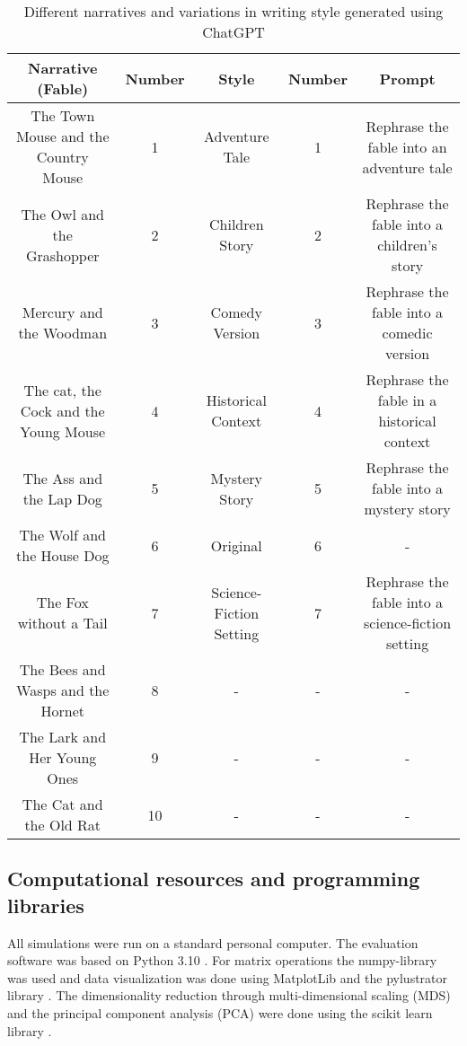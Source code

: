 \begin{table*}[h!]
\begin{center}
\caption{Different narratives and variations in writing style generated using ChatGPT}
\begin{tabular}{cc||ccc}
Narrative (Fable) & Number & Style & Number & Prompt\\
\hline
The Town Mouse and the Country Mouse & 1 & Adventure Tale & 1 & Rephrase the fable into an adventure tale \\
The Owl and the Grashopper & 2 & Children Story & 2 & Rephrase the fable into a children's story\\
Mercury and the Woodman & 3 & Comedy Version & 3 & Rephrase the fable into a comedic version\\
The cat, the Cock and the Young Mouse & 4 & Historical Context & 4 & Rephrase the fable in a historical context\\
The Ass and the Lap Dog & 5 &  Mystery Story & 5 & Rephrase the fable into a mystery story\\
The Wolf and the House Dog & 6 & Original & 6 & -\\
The Fox without a Tail & 7 & Science-Fiction Setting & 7 & Rephrase the fable into a science-fiction setting\\
The Bees and Wasps and the Hornet & 8 & - & - &-\\
The Lark and Her Young Ones & 9 & - & - & -\\
The Cat and the Old Rat & 10 & - & - & -\\
\end{tabular}
\label{tab:inputdata}
\end{center}
\end{table*}

\subsection{Computational resources and programming libraries}
All simulations were run on a standard personal computer. The evaluation software was based on Python 3.10 \cite{oliphant2007python}. For matrix operations the numpy-library \cite{van2011numpy} was used and data visualization was done using MatplotLib \cite{hunter2007matplotlib} and the pylustrator library \cite{gerum2019pylustrator}. The dimensionality reduction through multi-dimensional scaling (MDS) and the principal component analysis (PCA) were done using the scikit learn library \cite{scikit-learn, sklearn_api}. 

